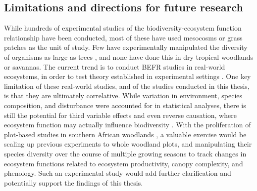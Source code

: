 \begin{refsection}
\section{Limitations and directions for future research}
\label{discussion:sec:future}

While hundreds of experimental studies of the biodiversity-ecosystem function relationship have been conducted, most of these have used mesocosms or grass patches as the unit of study. Few have experimentally manipulated the diversity of organisms as large as trees \citep{Huang2018, Ewers2011}, and none have done this in dry tropical woodlands or savannas. The current trend is to conduct BEFR studies in real-world ecosystems, in order to test theory established in experimental settings \citep{Plas2019}. One key limitation of these real-world studies, and of the studies conducted in this thesis, is that they are ultimately correlative. While variation in environment, species composition, and disturbance were accounted for in statistical analyses, there is still the potential for third variable effects and even reverse causation, where ecosystem function may actually influence biodiversity \citep{Eisenhauer2016}. With the proliferation of plot-based studies in southern African woodlands \citep{Ryan2020}, a valuable exercise would be scaling up previous experiments to whole woodland plots, and manipulating their species diversity over the course of multiple growing seasons to track changes in ecosystem functions related to ecosystem productivity, canopy complexity, and phenology. Such an experimental study would add further clarification and potentially support the findings of this thesis.


\end{refsection}
